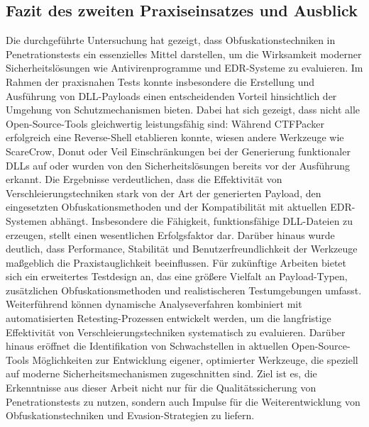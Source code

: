 \subsection{Fazit des zweiten Praxiseinsatzes und Ausblick}
Die durchgeführte Untersuchung hat gezeigt, dass Obfuskationstechniken in Penetrationstests ein essenzielles Mittel darstellen, um die Wirksamkeit moderner Sicherheitslösungen wie Antivirenprogramme und EDR-Systeme zu evaluieren. Im Rahmen der praxisnahen Tests konnte insbesondere die Erstellung und Ausführung von DLL-Payloads einen entscheidenden Vorteil hinsichtlich der Umgehung von Schutzmechanismen bieten. Dabei hat sich gezeigt, dass nicht alle Open-Source-Tools gleichwertig leistungsfähig sind: Während CTFPacker erfolgreich eine Reverse-Shell etablieren konnte, wiesen andere Werkzeuge wie ScareCrow, Donut oder Veil Einschränkungen bei der Generierung funktionaler DLLs auf oder wurden von den Sicherheitslösungen bereits vor der Ausführung erkannt.\newline
Die Ergebnisse verdeutlichen, dass die Effektivität von Verschleierungstechniken stark von der Art der generierten Payload, den eingesetzten Obfuskationsmethoden und der Kompatibilität mit aktuellen EDR-Systemen abhängt. Insbesondere die Fähigkeit, funktionsfähige DLL-Dateien zu erzeugen, stellt einen wesentlichen Erfolgsfaktor dar. Darüber hinaus wurde deutlich, dass Performance, Stabilität und Benutzerfreundlichkeit der Werkzeuge maßgeblich die Praxistauglichkeit beeinflussen.\newline
Für zukünftige Arbeiten bietet sich ein erweitertes Testdesign an, das eine größere Vielfalt an Payload-Typen, zusätzlichen Obfuskationsmethoden und realistischeren Testumgebungen umfasst. Weiterführend können dynamische Analyseverfahren kombiniert mit automatisierten Retesting-Prozessen entwickelt werden, um die langfristige Effektivität von Verschleierungstechniken systematisch zu evaluieren. Darüber hinaus eröffnet die Identifikation von Schwachstellen in aktuellen Open-Source-Tools Möglichkeiten zur Entwicklung eigener, optimierter Werkzeuge, die speziell auf moderne Sicherheitsmechanismen zugeschnitten sind. Ziel ist es, die Erkenntnisse aus dieser Arbeit nicht nur für die Qualitätssicherung von Penetrationstests zu nutzen, sondern auch Impulse für die Weiterentwicklung von Obfuskationstechniken und Evasion-Strategien zu liefern.
\newpage